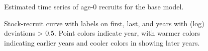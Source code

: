 \documentclass[
]{scrartcl}
\begin{document}
\begin{figure}[H]


\caption{\label{fig-recruits}Estimated time series of age-0 recruits for
the base model.}

\end{figure}%

\begin{figure}[H]


\caption{\label{fig-SR}Stock-recruit curve with labels on first, last,
and years with (log) deviations \textgreater{} 0.5. Point colors
indicate year, with warmer colors indicating earlier years and cooler
colors in showing later years.}

\end{figure}%
\end{document}
